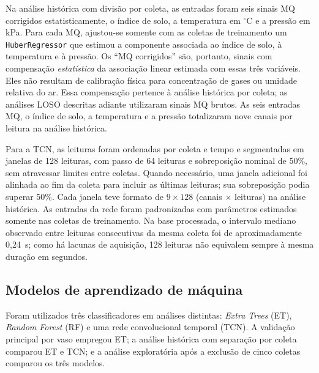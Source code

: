 Na análise histórica com divisão por coleta, as entradas foram seis
sinais MQ corrigidos estatisticamente, o índice de solo, a temperatura em $^{\circ}$C e a
pressão em kPa. Para cada MQ, ajustou-se somente com as coletas de
treinamento um \texttt{HuberRegressor} que estimou a componente associada
ao índice de solo, à temperatura e à pressão.
Os
``MQ corrigidos'' são, portanto, sinais com compensação \emph{estatística}
da associação linear estimada com essas três variáveis. Eles não resultam
de calibração física para concentração de gases ou umidade relativa do ar.
Essa compensação pertence à análise histórica por coleta; as análises LOSO
descritas adiante utilizaram sinais MQ brutos. As seis entradas MQ, o
índice de solo, a temperatura e a pressão totalizaram nove canais por
leitura na análise histórica.

Para a TCN, as leituras foram ordenadas por coleta e tempo e segmentadas
em janelas de 128 leituras, com passo de 64 leituras e sobreposição nominal
de 50\%, sem atravessar limites entre coletas. Quando necessário, uma
janela adicional foi alinhada ao fim da coleta para incluir as últimas
leituras; sua sobreposição podia superar 50\%. Cada janela teve formato de
$9\times128$ (canais $\times$ leituras) na análise histórica. As entradas
da rede foram padronizadas com parâmetros estimados somente nas coletas de
treinamento. Na base processada, o intervalo mediano observado entre
leituras consecutivas da mesma coleta foi de aproximadamente 0,24~s;
como há lacunas de aquisição, 128 leituras não equivalem sempre à mesma
duração em segundos.


\subsection{Modelos de aprendizado de máquina}
\label{subsec:modelos}

Foram utilizados três classificadores em análises distintas:
\emph{Extra Trees} (ET), \emph{Random Forest} (RF) e uma rede
convolucional temporal (TCN). A validação principal por vaso empregou
ET; a análise histórica com separação por coleta comparou ET e TCN; e
a análise exploratória após a exclusão de cinco coletas comparou os
três modelos.

